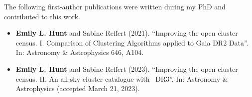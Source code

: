 %

The following first-author publications were written during my PhD and contributed to this work.

\begin{itemize}
    \item \textbf{Emily L. Hunt} and Sabine Reffert (2021). ``Improving the open cluster census. I. Comparison of Clustering Algorithms applied to Gaia DR2 Data''. In: Astronomy \& Astrophysics 646, A104.
    \item \textbf{Emily L. Hunt} and Sabine Reffert (2023). ``Improving the open cluster census. II. An all-sky cluster catalogue with \gaia\ DR3''. In: Astronomy \& Astrophysics (accepted March 21\first, 2023).
\end{itemize}
